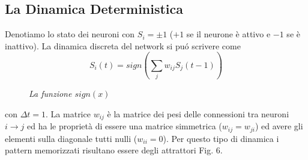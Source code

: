 \documentclass[12pt, a4paper]{book}
\theoremstyle{theorem}
\begin{document}
			\subsection{La Dinamica Deterministica}
				Denotiamo lo stato dei neuroni con $S_i=\pm 1$ ($+1$ se il neurone è attivo e $-1$ se è inattivo). La dinamica discreta del network si pu\'o scrivere come
				\begin{equation}
					S_i(t) = sign \left( \sum_j w_{ij} S_j(t-1)\right) 
				\end{equation}
				\begin{figure}
					\centering
					\caption{\textit{La funzione $sign(x)$}}
				\end{figure}
				con $\Delta t = 1$. La matrice $w_{ij}$ è la matrice dei pesi delle connessioni  tra neuroni $i\rightarrow j$ ed ha le proprietà di essere una matrice simmetrica ($w_{ij}=w_{ji}$) ed avere gli elementi sulla diagonale tutti nulli ($w_{ii}=0$).
				Per questo tipo di dinamica i pattern memorizzati risultano essere degli attrattori Fig. 6.
\end{document}
